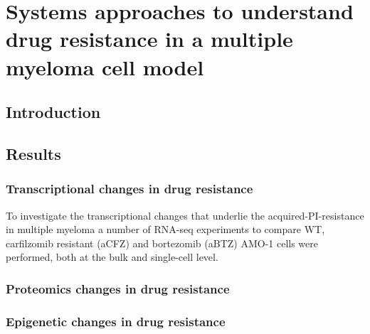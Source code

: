 \chapter{\label{ch:5-results_dose}Systems approaches to understand drug resistance in a multiple myeloma cell model}

\section{Introduction}\label{sec:systems_intro}

\section{Results}\label{sec:systems_results}


\subsection{Transcriptional changes in drug resistance}\label{subsec:systems_transcriptomics}

To investigate the transcriptional changes that underlie the acquired-PI-resistance in multiple myeloma a number of RNA-seq experiments to compare WT, carfilzomib resistant (aCFZ) and bortezomib (aBTZ) AMO-1 cells were performed, both at the bulk and single-cell level. 

\subsection{Proteomics changes in drug resistance}\label{subsec:systems_proteomics}


\subsection{Epigenetic changes in drug resistance}\label{subsec:systems_epigenetics}

